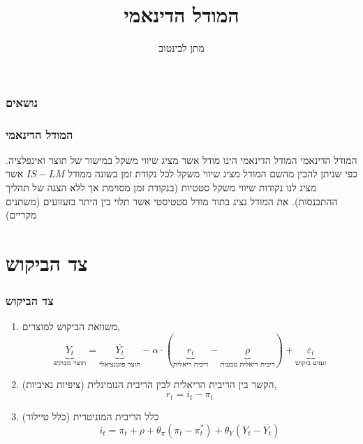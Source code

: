\documentclass[10pt,usenames,dvipsnames]{beamer}
\title[]{המודל הדינאמי}
\author{מתן לבינטוב}
\institute[{{ אב"ג}}]{{ אוניברסיטת בן גוריון בנגב}}
\date{}
\begin{document}
\begin{RTL}
\begin{frame}
\titlepage
\end{frame}
\begin{frame}
    \frametitle{נושאים}
    \tableofcontents

    

\end{frame}

\begin{frame}
    \frametitle{המודל הדינאמי}
    \begin{block}{המודל הדינאמי}
        המודל הדינאמי הינו מודל אשר מציג שיווי משקל במישור של תוצר ואינפלציה. כפי שניתן להבין מהשם המודל מציג שיווי
משקל לכל נקודת זמן בשונה ממודל $IS-LM$ אשר מציג לנו נקודות שיווי משקל סטטיות (בנקודת זמן מסוימת אך ללא
הצגה של תהליך ההתכנסות). את המודל נציג בתור מודל סטטיסטי אשר תלוי בין היתר בזעזועים (משתנים מקריים)
    \end{block}

    

\end{frame}

\section{צד הביקוש}
\begin{frame}[allowframebreaks]
    \frametitle{צד הביקוש}
    \begin{enumerate}
        \item משוואת הביקוש למוצרים,
        $$\underbrace{Y_t}_{\text{תוצר מבוקש}} = \underbrace{\overline{Y_t}}_{\text{תוצר פוטנציאלי}} - \alpha \cdot (\underbrace{r_t}_{\text{ריבית ריאלית}} - \underbrace{\rho}_{\text{ריבית ריאלית טבעית}}) + \underbrace{\varepsilon_t }_{\text{זעזוע ביקוש}}$$
        \item הקשר בין הריבית הריאלית לבין הריבית הנומינלית (ציפיות נאיביות),
        $$r_t = i_t - \pi_t$$
        \item כלל הריבית המוניטרית (כלל טיילור)
        $$i_t = \pi_t + \rho +\theta_\pi \left(\pi_t - \pi^*_t\right) + \theta_Y \left(Y_t - \overline{Y_t}\right)$$
    \end{enumerate}
    

\end{frame}
\end{RTL}
\end{document}
